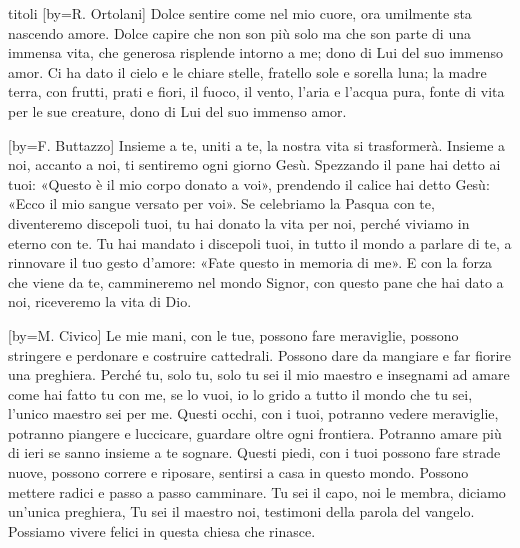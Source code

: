 \begin{songs}{titoli}
[by={R. Ortolani}]
\beginverse
Dolce sentire come nel mio cuore,
ora umilmente sta nascendo amore.
Dolce capire che non son più solo
ma che son parte di una immensa vita,
che generosa risplende intorno a me;
dono di Lui del suo immenso amor.
\endverse
\beginverse
Ci ha dato il cielo e le chiare stelle,
fratello sole e sorella luna;
la madre terra, con frutti, prati e fiori,
il fuoco, il vento, l'aria e l'acqua pura,
fonte di vita per le sue creature,
dono di Lui del suo immenso amor. 
\endverse
\endsong

[by={F. Buttazzo}]
\beginchorus
Insieme a te, uniti a te,
la nostra vita si trasformerà.
Insieme a noi, accanto a noi,
ti sentiremo ogni giorno Gesù.
\endchorus
\beginverse
Spezzando il pane hai detto ai tuoi:
«Questo è il mio corpo donato a voi»,
prendendo il calice hai detto Gesù:
«Ecco il mio sangue versato per voi».
\endverse
\beginverse
Se celebriamo la Pasqua con te,
diventeremo discepoli tuoi,
tu hai donato la vita per noi,
perché viviamo in eterno con te.
\endverse
\beginverse
Tu hai mandato i discepoli tuoi,
in tutto il mondo a parlare di te,
a rinnovare il tuo gesto d'amore:
«Fate questo in memoria di me».
\endverse
\beginverse
E con la forza che viene da te,
cammineremo nel mondo Signor,
con questo pane che hai dato a noi,
riceveremo la vita di Dio.
\endverse
\endsong

[by={M. Civico}]
\beginverse
Le mie mani, con le tue, possono fare meraviglie,
possono stringere e perdonare e costruire cattedrali.
Possono dare da mangiare e far fiorire una preghiera.
\endverse
\beginchorus
Perché tu, solo tu, solo tu sei il mio maestro e insegnami
ad amare come hai fatto tu con me,
se lo vuoi, io lo grido a tutto il mondo che tu sei,
l'unico maestro sei per me.
\endchorus
\beginverse
Questi occhi, con i tuoi, potranno vedere meraviglie,
potranno piangere e luccicare, guardare oltre ogni frontiera.
Potranno amare più di ieri se sanno insieme a te sognare.
\endverse
\beginverse
Questi piedi, con i tuoi possono fare strade nuove,
possono correre e riposare, sentirsi a casa in questo mondo.
Possono mettere radici e passo a passo camminare.
\endverse
\beginverse
Tu sei il capo, noi le membra, diciamo un'unica preghiera,
Tu sei il maestro noi, testimoni della parola del vangelo.
Possiamo vivere felici in questa chiesa che rinasce.
\endverse
\endsong


\end{songs}
